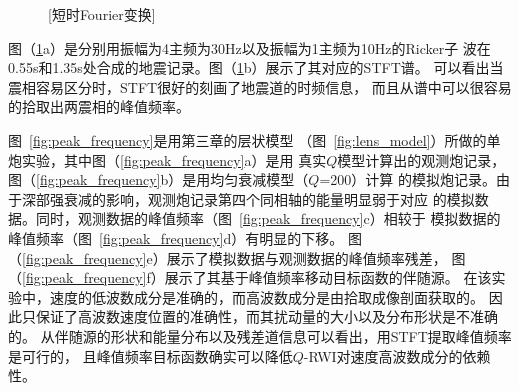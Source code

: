 \begin{figure}[!htbp]
    \centering
    [短时Fourier变换]
    \label{fig:stft_effect}
\end{figure}
图（\ref{fig:stft_effect}a）是分别用振幅为4主频为30Hz以及振幅为1主频为10Hz的Ricker子
波在0.55s和1.35s处合成的地震记录。图（\ref{fig:stft_effect}b）展示了其对应的STFT谱。
可以看出当震相容易区分时，STFT很好的刻画了地震道的时频信息，
而且从谱中可以很容易的拾取出两震相的峰值频率。

图~\ref{fig:peak_frequency}是用第三章的层状模型
（图~\ref{fig:lens_model}）所做的单炮实验，其中图（\ref{fig:peak_frequency}a）是用
真实$Q$模型计算出的观测炮记录，图（\ref{fig:peak_frequency}b）是用均匀衰减模型（$Q$=200）计算
的模拟炮记录。由于深部强衰减的影响，观测炮记录第四个同相轴的能量明显弱于对应
的模拟数据。同时，观测数据的峰值频率（图~\ref{fig:peak_frequency}c）相较于
模拟数据的峰值频率（图~\ref{fig:peak_frequency}d）有明显的下移。
图（\ref{fig:peak_frequency}e）展示了模拟数据与观测数据的峰值频率残差，
图（\ref{fig:peak_frequency}f）展示了其基于峰值频率移动目标函数的伴随源。
在该实验中，速度的低波数成分是准确的，而高波数成分是由拾取成像剖面获取的。
因此只保证了高波数速度位置的准确性，而其扰动量的大小以及分布形状是不准确的。
从伴随源的形状和能量分布以及残差道信息可以看出，用STFT提取峰值频率是可行的，
且峰值频率目标函数确实可以降低$Q$-RWI对速度高波数成分的依赖性。

